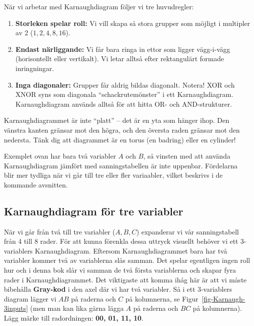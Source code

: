 \documentclass[
  swedish,
  letterpaper,
  oneside,
  openany]{book}
\providecommand{\tightlist}{%
  \setlength{\itemsep}{0pt}\setlength{\parskip}{0pt}}
\begin{document}
När vi arbetar med Karnaughdiagram följer vi tre huvudregler:

\begin{enumerate}
\def\labelenumi{\arabic{enumi}.}
\tightlist
\item
  \textbf{Storleken spelar roll:} Vi vill skapa så stora grupper som
  möjligt i multipler av 2 (\(1, 2, 4, 8, 16\)).
\item
  \textbf{Endast närliggande:} Vi får bara ringa in ettor som ligger
  vägg-i-vägg (horisontellt eller vertikalt). Vi letar alltså efter
  rektangulärt formade inringningar.
\item
  \textbf{Inga diagonaler:} Grupper får aldrig bildas diagonalt. Notera!
  XOR och XNOR syns som diagonala ``schackrutemönster'' i ett
  Karnaughdiagram. Karnaughdiagram används alltså för att hitta OR- och
  AND-strukturer.
\end{enumerate}

\begin{tcolorbox}[enhanced jigsaw, arc=.35mm, bottomrule=.15mm, bottomtitle=1mm, breakable, colback=white, colbacktitle=quarto-callout-tip-color!10!white, colframe=quarto-callout-tip-color-frame, coltitle=black, left=2mm, leftrule=.75mm, opacityback=0, opacitybacktitle=0.6, rightrule=.15mm, title=\textcolor{quarto-callout-tip-color}{\faLightbulb}\hspace{0.5em}{Kom ihåg!}, titlerule=0mm, toprule=.15mm, toptitle=1mm]

Karnaughdiagrammet är inte ``platt'' -- det är en yta som hänger ihop.
Den vänstra kanten gränsar mot den högra, och den översta raden gränsar
mot den nedersta. Tänk dig att diagrammet är en torus (en badring) eller
en cylinder!

\end{tcolorbox}

Exemplet ovan har bara två variabler \(A\) och \(B\), så vinsten med att
använda Karnaughdiagram jämfört med sanningstabellen är inte uppenbar.
Fördelarna blir mer tydliga när vi går till tre eller fler variaabler,
vilket beskrivs i de kommande avsnitten.

\subsection{Karnaughdiagram för tre
variabler}\label{karnaughdiagram-fuxf6r-tre-variabler}

När vi går från två till tre variabler (\(A, B, C\)) expanderar vi vår
sanningstabell från 4 till 8 rader. För att kunna förenkla dessa uttryck
visuellt behöver vi ett 3-variablers Karnaughdiagram. Eftersom
Karnaughdiagrammet bara har två variabler kommer två av variablerna slås
samman. Det spelar egentligen ingen roll hur och i denna bok slår vi
samman de två första variablerna och skapar fyra rader i
Karnaughdiagrammet. Det viktigaste att komma ihåg här är att vi måste
bibehålla \textbf{Gray-kod} i den axel där vi har två variabler. Så i
ett 3-variablers diagram lägger vi \(AB\) på raderna och \(C\) på
kolumnerna, se Figur~\ref{fig-Karnaugh-3inputs} (men man kan lika gärna
lägga \(A\) på raderna och \(BC\) på kolumnerna). Lägg märke till
radordningen: \textbf{00, 01, 11, 10}.
\end{document}
